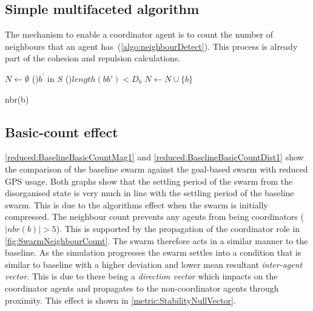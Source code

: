 \subsection{Simple multifaceted algorithm}
The mechanism to enable a coordinator agent is to count the number of neighbours that an agent has~(\autoref{algo:neighbourDetect}). This process is already part of the cohesion and repulsion calculations.

\begin{algorithm}[H]
\DontPrintSemicolon
\SetAlgoLined
{}
$N \longleftarrow \emptyset$\;
\ForEach(){$b^{'}$ in $S$}
{
  \If(){$length(bb') < D_{b}$}
  {
     $N \longleftarrow N \cup \{b\}$
  }
}
\caption[Neighbour Detection]{nbr(b)}\label{algo:neighbourDetect}
\end{algorithm}

\subsection{Basic-count effect\label{section:compareBaselineBasicCount1}}
\autoref{reduced:BaselineBasicCountMag1} and \autoref{reduced:BaselineBasicCountDist1} show the comparison of the baseline swarm against the goal-based swarm with reduced GPS usage. Both graphs show that the settling period of the swarm from the disorganised state is very much in line with the settling period of the baseline swarm. This is due to the algorithms effect when the swarm is initially compressed. The neighbour count prevents any agents from being coordinators ($|nbr(b)| > 5$). This is supported by the propagation of the coordinator role in \autoref{fig:SwarmNeighbourCount}. The swarm therefore acts in a similar manner to the baseline. As the simulation progresses the swarm settles into a condition that is similar to baseline with a higher deviation and lower mean resultant \textit{inter-agent vector}. This is due to there being a \textit{direction vector} which impacts on the coordinator agents and propagates to the non-coordinator agents through proximity. This effect is shown in \autoref{metric:StabilityNullVector}. 

